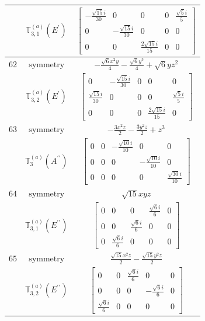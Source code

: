 \documentclass[fleqn,8pt,landscape]{jsarticle}
\begin{document}
\begin{longtable}{ccc}
$  $ & $ \mathbb{T}_{3,1}^{(a)}(E^{\prime}) $ & $ \begin{bmatrix} - \frac{\sqrt{15} i}{30} & 0 & 0 & 0 & \frac{\sqrt{5} i}{5} \\ 0 & - \frac{\sqrt{15} i}{30} & 0 & 0 & 0 \\ 0 & 0 & \frac{2 \sqrt{15} i}{15} & 0 & 0 \end{bmatrix} $ \\ \hline
$ 62 $ & $ \text{symmetry} $ & $ - \frac{\sqrt{6} x^{2} y}{4} - \frac{\sqrt{6} y^{3}}{4} + \sqrt{6} y z^{2} $ \\
$  $ & $ \mathbb{T}_{3,2}^{(a)}(E^{\prime}) $ & $ \begin{bmatrix} 0 & - \frac{\sqrt{15} i}{30} & 0 & 0 & 0 \\ \frac{\sqrt{15} i}{30} & 0 & 0 & 0 & \frac{\sqrt{5} i}{5} \\ 0 & 0 & 0 & \frac{2 \sqrt{15} i}{15} & 0 \end{bmatrix} $ \\ \hline
$ 63 $ & $ \text{symmetry} $ & $ - \frac{3 x^{2} z}{2} - \frac{3 y^{2} z}{2} + z^{3} $ \\
$  $ & $ \mathbb{T}_{3}^{(a)}(A^{\prime\prime}) $ & $ \begin{bmatrix} 0 & 0 & - \frac{\sqrt{10} i}{10} & 0 & 0 \\ 0 & 0 & 0 & - \frac{\sqrt{10} i}{10} & 0 \\ 0 & 0 & 0 & 0 & \frac{\sqrt{30} i}{10} \end{bmatrix} $ \\ \hline
$ 64 $ & $ \text{symmetry} $ & $ \sqrt{15} x y z $ \\
$  $ & $ \mathbb{T}_{3,1}^{(a)}(E^{\prime\prime}) $ & $ \begin{bmatrix} 0 & 0 & 0 & \frac{\sqrt{6} i}{6} & 0 \\ 0 & 0 & \frac{\sqrt{6} i}{6} & 0 & 0 \\ 0 & \frac{\sqrt{6} i}{6} & 0 & 0 & 0 \end{bmatrix} $ \\ \hline
$ 65 $ & $ \text{symmetry} $ & $ \frac{\sqrt{15} x^{2} z}{2} - \frac{\sqrt{15} y^{2} z}{2} $ \\
$  $ & $ \mathbb{T}_{3,2}^{(a)}(E^{\prime\prime}) $ & $ \begin{bmatrix} 0 & 0 & \frac{\sqrt{6} i}{6} & 0 & 0 \\ 0 & 0 & 0 & - \frac{\sqrt{6} i}{6} & 0 \\ \frac{\sqrt{6} i}{6} & 0 & 0 & 0 & 0 \end{bmatrix} $ \\ \hline

\end{longtable}
\end{document}
